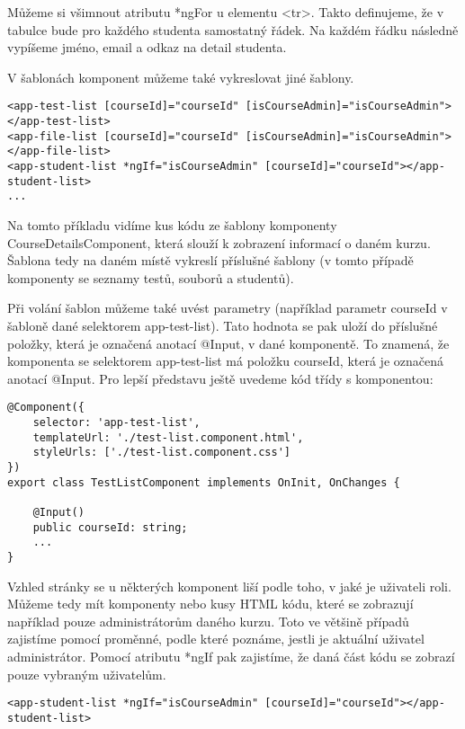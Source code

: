 Můžeme si všimnout atributu *ngFor u elementu <tr>. Takto definujeme, že v tabulce bude pro každého studenta samostatný řádek.
Na každém řádku následně vypíšeme jméno, email a odkaz na detail studenta.

\vspace{\baselineskip}

V šablonách komponent můžeme také vykreslovat jiné šablony.

\begin{lstlisting}
<app-test-list [courseId]="courseId" [isCourseAdmin]="isCourseAdmin"></app-test-list>
<app-file-list [courseId]="courseId" [isCourseAdmin]="isCourseAdmin"></app-file-list>
<app-student-list *ngIf="isCourseAdmin" [courseId]="courseId"></app-student-list>
...
\end{lstlisting}

Na tomto příkladu vidíme kus kódu ze šablony komponenty CourseDetailsComponent, která slouží k zobrazení informací o daném kurzu. Šablona tedy na daném místě vykreslí příslušné šablony (v tomto případě komponenty se seznamy testů, souborů a studentů).

Při volání šablon můžeme také uvést parametry (například parametr courseId v šabloně dané selektorem app-test-list). Tato hodnota se pak uloží do příslušné položky, která je označená anotací @Input, v dané komponentě. To znamená, že komponenta se selektorem app-test-list má položku courseId, která je označená anotací @Input. Pro lepší představu ještě uvedeme kód třídy s komponentou:

\lstset{style=typescript}
\begin{lstlisting}
@Component({
	selector: 'app-test-list',
	templateUrl: './test-list.component.html',
	styleUrls: ['./test-list.component.css']
})
export class TestListComponent implements OnInit, OnChanges {

	@Input()
	public courseId: string;
	...
}
\end{lstlisting}

\vspace{\baselineskip}

Vzhled stránky se u některých komponent liší podle toho, v jaké je uživateli roli. Můžeme tedy mít komponenty nebo kusy HTML kódu, které se zobrazují například pouze administrátorům daného kurzu.
Toto ve většině případů zajistíme pomocí proměnné, podle které poznáme, jestli je aktuální uživatel administrátor.
Pomocí atributu *ngIf pak zajistíme, že daná část kódu se zobrazí pouze vybraným uživatelům.

\begin{lstlisting}
<app-student-list *ngIf="isCourseAdmin" [courseId]="courseId"></app-student-list>
\end{lstlisting}

